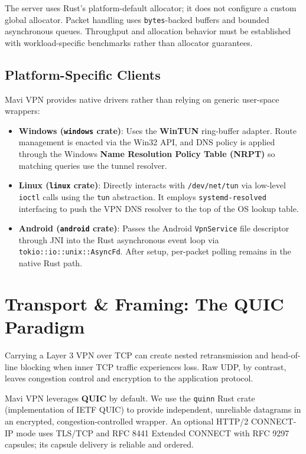 \documentclass[11pt,a4paper]{article}
\begin{document}
The server uses Rust's platform-default allocator; it does not configure a custom global allocator. Packet handling uses \texttt{bytes}-backed buffers and bounded asynchronous queues. Throughput and allocation behavior must be established with workload-specific benchmarks rather than allocator guarantees.

\subsection{Platform-Specific Clients}
Mavi VPN provides native drivers rather than relying on generic user-space wrappers:
\begin{itemize}
    \item \textbf{Windows (\texttt{windows} crate)}: Uses the \textbf{WinTUN} ring-buffer adapter. Route management is enacted via the Win32 API, and DNS policy is applied through the Windows \textbf{Name Resolution Policy Table (NRPT)} so matching queries use the tunnel resolver.
    \item \textbf{Linux (\texttt{linux} crate)}: Directly interacts with \texttt{/dev/net/tun} via low-level \texttt{ioctl} calls using the \texttt{tun} abstraction. It employs \texttt{systemd-resolved} interfacing to push the VPN DNS resolver to the top of the OS lookup table.
    \item \textbf{Android (\texttt{android} crate)}: Passes the Android \texttt{VpnService} file descriptor through JNI into the Rust asynchronous event loop via \texttt{tokio::io::unix::AsyncFd}. After setup, per-packet polling remains in the native Rust path.
\end{itemize}

\section{Transport \& Framing: The QUIC Paradigm}

Carrying a Layer 3 VPN over TCP can create nested retransmission and head-of-line blocking when inner TCP traffic experiences loss. Raw UDP, by contrast, leaves congestion control and encryption to the application protocol.

Mavi VPN leverages \textbf{QUIC} by default. We use the \texttt{quinn} Rust crate (implementation of IETF QUIC) to provide independent, unreliable datagrams in an encrypted, congestion-controlled wrapper. An optional HTTP/2 CONNECT-IP mode uses TLS/TCP and RFC 8441 Extended CONNECT with RFC 9297 capsules; its capsule delivery is reliable and ordered.
\end{document}
